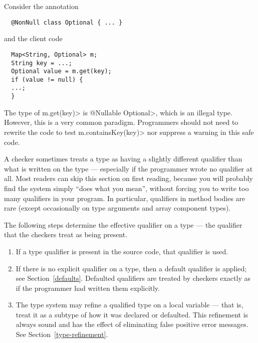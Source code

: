 Consider the annotation
\begin{Verbatim}
  @NonNull class Optional { ... }
\end{Verbatim}
and the client code

\begin{Verbatim}
  Map<String, Optional> m;
  String key = ...;
  Optional value = m.get(key);
  if (value != null) {
  ...;
  }
\end{Verbatim}

The type of \<m.get(key)> is \<@Nullable Optional>, which is an illegal type.
However, this is a very common paradigm.  Programmers should not need to rewrite the code to test
\<m.containsKey(key)> nor suppress a warning in this safe code.


A checker sometimes treats a type as having a slightly different qualifier
than what is written on the type --- especially if the programmer wrote no
qualifier at all.
Most readers can skip this section on first reading, because you will
probably find the system simply ``does what you mean'', without forcing
you to write too many qualifiers in your program.
In particular, qualifiers in method bodies are rare (except occasionally on
type arguments and array component types).

The following steps determine the effective
qualifier on a type --- the qualifier that the checkers treat as being present.

\begin{enumerate}
\item
  If a type qualifier is present in the source code, that qualifier is used.

\item
  If there is no explicit qualifier on a type, then a default
  qualifier
  is applied; see Section~\ref{defaults}. Defaulted qualifiers are treated by checkers
  exactly as if the programmer had written them explicitly.

\item
  The type system may refine a qualified type on a local variable --- that
  is, treat it as a subtype of how it was declared or defaulted.  This
  refinement is always sound and has the effect of eliminating false
  positive error messages.  See Section~\ref{type-refinement}.

\end{enumerate}

